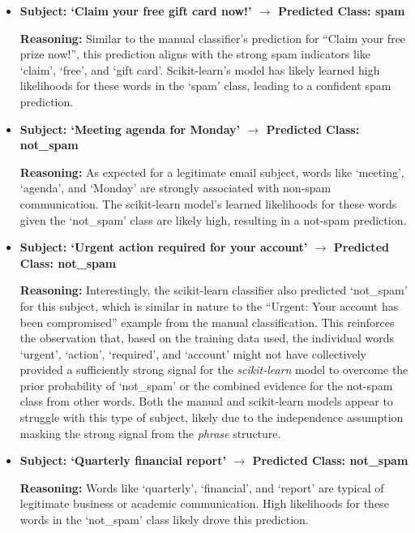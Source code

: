 \documentclass[12pt,letterpaper]{article}
\begin{document}
\begin{itemize}
    \item \textbf{Subject: `Claim your free gift card now!' $\rightarrow$ Predicted Class: spam}
    
    \textbf{Reasoning:} Similar to the manual classifier's prediction for ``Claim your free prize now!'', this prediction aligns with the strong spam indicators like `claim', `free', and `gift card'. Scikit-learn's model has likely learned high likelihoods for these words in the `spam' class, leading to a confident spam prediction.

    \item \textbf{Subject: `Meeting agenda for Monday' $\rightarrow$ Predicted Class: not\_spam}
    
    \textbf{Reasoning:} As expected for a legitimate email subject, words like `meeting', `agenda', and `Monday' are strongly associated with non-spam communication. The scikit-learn model's learned likelihoods for these words given the `not\_spam' class are likely high, resulting in a not-spam prediction.

    \item \textbf{Subject: `Urgent action required for your account' $\rightarrow$ Predicted Class: not\_spam}
    
    \textbf{Reasoning:} Interestingly, the scikit-learn classifier also predicted `not\_spam' for this subject, which is similar in nature to the ``Urgent: Your account has been compromised'' example from the manual classification. This reinforces the observation that, based on the training data used, the individual words `urgent', `action', `required', and `account' might not have collectively provided a sufficiently strong signal for the \textit{scikit-learn} model to overcome the prior probability of `not\_spam' or the combined evidence for the not-spam class from other words. Both the manual and scikit-learn models appear to struggle with this type of subject, likely due to the independence assumption masking the strong signal from the \textit{phrase} structure.

    \item \textbf{Subject: `Quarterly financial report' $\rightarrow$ Predicted Class: not\_spam}
    
    \textbf{Reasoning:} Words like `quarterly', `financial', and `report' are typical of legitimate business or academic communication. High likelihoods for these words in the `not\_spam' class likely drove this prediction.


\end{itemize}
\end{document}
